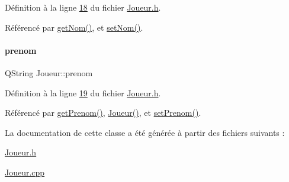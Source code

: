 Définition à la ligne \hyperlink{_joueur_8h_source_l00018}{18} du fichier \hyperlink{_joueur_8h_source}{Joueur.\+h}.



Référencé par \hyperlink{_joueur_8cpp_source_l00023}{get\+Nom()}, et \hyperlink{_joueur_8cpp_source_l00028}{set\+Nom()}.

\mbox{\label{class_joueur_a96d4237143c2e57b8025c4e116e95909}} 
\paragraph{\texorpdfstring{prenom}{prenom}}
{\footnotesize\ttfamily Q\+String Joueur\+::prenom\hspace{0.3cm}{\ttfamily [private]}}



Définition à la ligne \hyperlink{_joueur_8h_source_l00019}{19} du fichier \hyperlink{_joueur_8h_source}{Joueur.\+h}.



Référencé par \hyperlink{_joueur_8cpp_source_l00033}{get\+Prenom()}, \hyperlink{_joueur_8cpp_source_l00013}{Joueur()}, et \hyperlink{_joueur_8cpp_source_l00038}{set\+Prenom()}.



La documentation de cette classe a été générée à partir des fichiers suivants \+:\begin{DoxyCompactItemize}
\item 
\hyperlink{_joueur_8h}{Joueur.\+h}\item 
\hyperlink{_joueur_8cpp}{Joueur.\+cpp}\end{DoxyCompactItemize}
